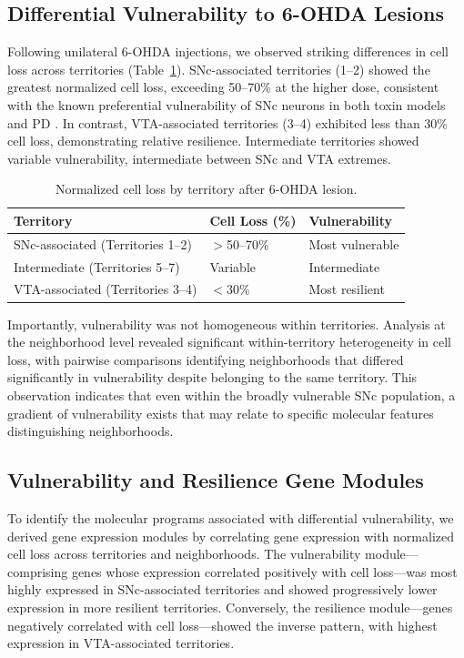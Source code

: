 \documentclass[12pt]{article}
\begin{document}
\subsection{Differential Vulnerability to 6-OHDA Lesions}

Following unilateral 6-OHDA injections, we observed striking differences in cell loss across territories (Table~\ref{tab:vulnerability}). SNc-associated territories (1--2) showed the greatest normalized cell loss, exceeding 50--70\% at the higher dose, consistent with the known preferential vulnerability of SNc neurons in both toxin models and PD \citep{damier1999substantia, surmeier2017selective}. In contrast, VTA-associated territories (3--4) exhibited less than 30\% cell loss, demonstrating relative resilience. Intermediate territories showed variable vulnerability, intermediate between SNc and VTA extremes.

\begin{table}[ht]
\centering
\caption{Normalized cell loss by territory after 6-OHDA lesion.}
\label{tab:vulnerability}
\begin{tabular}{lll}
\toprule
Territory & Cell Loss (\%) & Vulnerability \\
\midrule
SNc-associated (Territories 1--2) & $>$50--70\% & Most vulnerable \\
Intermediate (Territories 5--7) & Variable & Intermediate \\
VTA-associated (Territories 3--4) & $<$30\% & Most resilient \\
\bottomrule
\end{tabular}
\end{table}

Importantly, vulnerability was not homogeneous within territories. Analysis at the neighborhood level revealed significant within-territory heterogeneity in cell loss, with pairwise comparisons identifying neighborhoods that differed significantly in vulnerability despite belonging to the same territory. This observation indicates that even within the broadly vulnerable SNc population, a gradient of vulnerability exists that may relate to specific molecular features distinguishing neighborhoods.

\subsection{Vulnerability and Resilience Gene Modules}

To identify the molecular programs associated with differential vulnerability, we derived gene expression modules by correlating gene expression with normalized cell loss across territories and neighborhoods. The vulnerability module---comprising genes whose expression correlated positively with cell loss---was most highly expressed in SNc-associated territories and showed progressively lower expression in more resilient territories. Conversely, the resilience module---genes negatively correlated with cell loss---showed the inverse pattern, with highest expression in VTA-associated territories.
\end{document}
